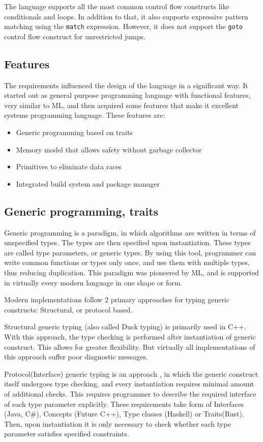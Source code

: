 The language supports all the most common control flow constructs like conditionals and loops. In addition to that, it
also supports expressive pattern matching using the \verb|match| expression. However, it does not support the
\verb|goto| control flow construct for unrestricted jumps.

\subsection{Features}
The requirements influenced the design of the language in a significant way. It started out as general purpose programming
language with functional features, very similar to ML, and then acquired some features that make it excellent
systems programming language. These features are:

\begin{itemize}
    \item Generic programming based on traits
    \item Memory model that allows safety without garbage collector
    \item Primitives to eliminate data races
    \item Integrated build system and package manager
\end{itemize}

\subsection{Generic programming, traits}
Generic programming is a paradigm, in which algorithms are written in terms of unspecified types.
The types are then specified upon instantiation. These types are called type parameters, or generic types.
By using this tool, programmer can write common functions or types only once, and use them with multiple
types, thus reducing duplication. This paradigm was pioneered by ML, and is supported in virtually every
modern language in one shape or form.

Modern implementations follow 2 primary approaches for typing generic constructs: Structural, or protocol based.

Structural generic typing (also called Duck typing) is primarily used in C++. With this approach, the type
checking is performed after instantiation of generic construct. This allows for greater flexibility.
But virtually all implementations of this approach suffer poor diagnostic messages\cite{Traver:2010:CEM:1863617.1945532}.

Protocol(Interface) generic typing is an approach , in which the generic construct itself undergoes type checking, and
every instantiation requires minimal amount of additional checks. This requires programmer to describe the required interface
of each type parameter explicitly. These requirements take form of Interfaces (Java, C\#), Concepts (Future C++),
Type classes (Haskell) or Traits(Rust). Then, upon instantiation it is only necessary to check whether
each type parameter satisfies specified constraints.


